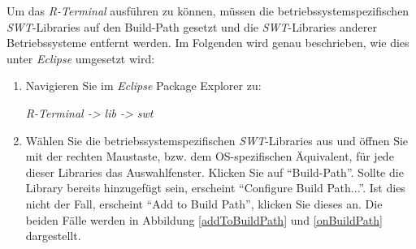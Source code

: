 \documentclass[a4paper, 12pt]{report} %
\begin{document}
Um das \textit{R-Terminal} ausführen zu können, müssen die betriebssystemspezifischen \textit{SWT}-Libraries auf den Build-Path gesetzt und die \textit{SWT}-Libraries anderer Betriebssysteme entfernt werden.
Im Folgenden wird genau beschrieben, wie dies unter \textit{Eclipse} umgesetzt wird:
\begin{enumerate}
	\item Navigieren Sie im \textit{Eclipse} Package Explorer zu:
	\begin{center}\textit{R-Terminal -> lib  -> swt} \end{center}
	
	\item Wählen Sie die betriebssystemspezifischen \textit{SWT}-Libraries aus und öffnen Sie mit der rechten Maustaste, bzw. dem OS-spezifischen Äquivalent, für jede dieser Libraries das Auswahlfenster. Klicken Sie auf "`Build-Path"'.
		Sollte die Library bereits hinzugefügt sein, erscheint "`Configure Build Path..."'. Ist dies nicht der Fall, erscheint "`Add to Build Path"', klicken Sie dieses an. Die beiden Fälle werden  in Abbildung \ref{addToBuildPath} und \ref{onBuildPath} dargestellt.  \\


\end{enumerate}
\end{document}
